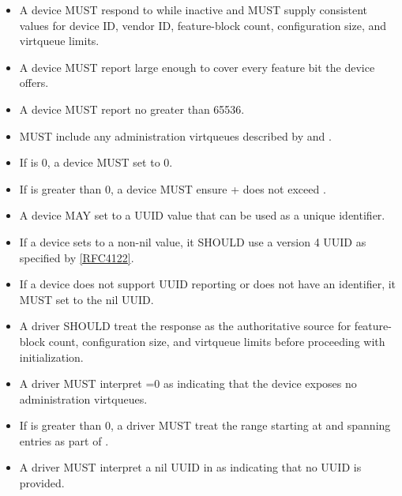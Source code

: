 \begin{itemize}
  \item A device MUST respond to  while inactive and
        MUST supply consistent values for device ID, vendor ID, feature-block
        count, configuration size, and virtqueue limits.
  \item A device MUST report  large enough to cover
        every feature bit the device offers.
  \item A device MUST report  no greater than 65536.
  \item {} MUST include any administration virtqueues
        described by  and .
  \item If  is 0, a device MUST set
         to 0.
  \item If  is greater than 0, a device MUST ensure
         +  does not exceed
        .
  \item A device MAY set  to a UUID value that can be used
        as a unique identifier.
  \item If a device sets  to a non-nil value, it SHOULD use
        a version 4 UUID as specified by
        \hyperref[intro:rfc4122]{[RFC4122]}.
  \item If a device does not support UUID reporting or does not have an
        identifier, it MUST set  to the nil UUID.
\end{itemize}

\begin{itemize}
  \item A driver SHOULD treat the response as the authoritative source for
        feature-block count, configuration size, and virtqueue limits before
        proceeding with initialization.
  \item A driver MUST interpret =0 as indicating that the
        device exposes no administration virtqueues.
  \item If  is greater than 0, a driver MUST treat the
        range starting at  and spanning
         entries as part of .
  \item A driver MUST interpret a nil UUID in  as indicating
        that no UUID is provided.
\end{itemize}

